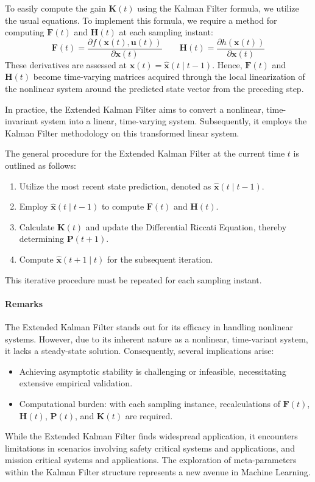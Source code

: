 To easily compute the gain $\mathbf{K}(t)$ using the Kalman Filter formula, we utilize the usual equations.
To implement this formula, we require a method for computing $\mathbf{F}(t)$ and $\mathbf{H}(t)$ at each sampling instant:
\[\mathbf{F}(t)=\dfrac{\partial f(\mathbf{x}(t),\mathbf{u}(t))}{\partial \mathbf{x}(t)} \qquad \mathbf{H}(t)=\dfrac{\partial h(\mathbf{x}(t))}{\partial \mathbf{x}(t)}\]
These derivatives are assessed at $\mathbf{x}(t)=\hat{\mathbf{x}}(t\mid t-1)$. 
Hence, $\mathbf{F}(t)$ and $\mathbf{H}(t)$ become time-varying matrices acquired through the local linearization of the nonlinear system around the predicted state vector from the preceding step.

In practice, the Extended Kalman Filter aims to convert a nonlinear, time-invariant system into a linear, time-varying system. 
Subsequently, it employs the Kalman Filter methodology on this transformed linear system.

The general procedure for the Extended Kalman Filter at the current time $t$ is outlined as follows:
\begin{enumerate}
    \item Utilize the most recent state prediction, denoted as $\hat{\mathbf{x}}(t\mid t-1)$. 
    \item Employ $\hat{\mathbf{x}}(t\mid t-1)$ to compute $\mathbf{F}(t)$ and $\mathbf{H}(t)$. 
    \item Calculate $\mathbf{K}(t)$  and update the Differential Riccati Equation, thereby determining $\mathbf{P}(t+1)$. 
    \item Compute $\hat{\mathbf{x}}(t+1\mid t)$ for the subsequent iteration.
\end{enumerate}
This iterative procedure must be repeated for each sampling instant. 

\paragraph*{Remarks}
The Extended Kalman Filter stands out for its efficacy in handling nonlinear systems. 
However, due to its inherent nature as a nonlinear, time-variant system, it lacks a steady-state solution. 
Consequently, several implications arise:
\begin{itemize}
    \item Achieving asymptotic stability is challenging or infeasible, necessitating extensive empirical validation.
    \item Computational burden: with each sampling instance, recalculations of $\mathbf{F}(t)$, $\mathbf{H}(t)$, $\mathbf{P}(t)$, and $\mathbf{K}(t)$ are required.
\end{itemize}
While the Extended Kalman Filter finds widespread application, it encounters limitations in scenarios involving safety critical systems and applications, and mission critical systems and applications. 
The exploration of meta-parameters within the Kalman Filter structure represents a new avenue in Machine Learning.
